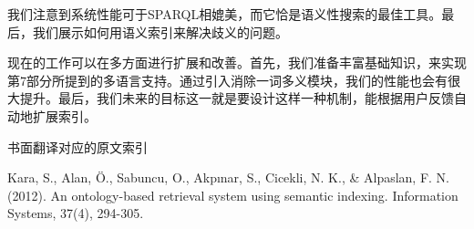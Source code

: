 我们注意到系统性能可于{\Times SPARQL}相媲美，而它恰是语义性搜索的最佳工具。最后，我们展示如何用语义索引来解决歧义的问题。

现在的工作可以在多方面进行扩展和改善。首先，我们准备丰富基础知识，来实现第7部分所提到的多语言支持。通过引入消除一词多义模块，我们的性能也会有很大提升。最后，我们未来的目标这一就是要设计这样一种机制，能根据用户反馈自动地扩展索引。



\vspace{20pt}
\centering 书面翻译对应的原文索引
\vspace{9pt}

\noindent
{\Times \wuhao \setlength{\baselineskip}{17pt}
Kara, S., Alan, Ö., Sabuncu, O., Akpınar, S., Cicekli, N. K., \& Alpaslan, F. N. (2012). An ontology-based retrieval system using semantic indexing. Information Systems, 37(4), 294-305.
}

